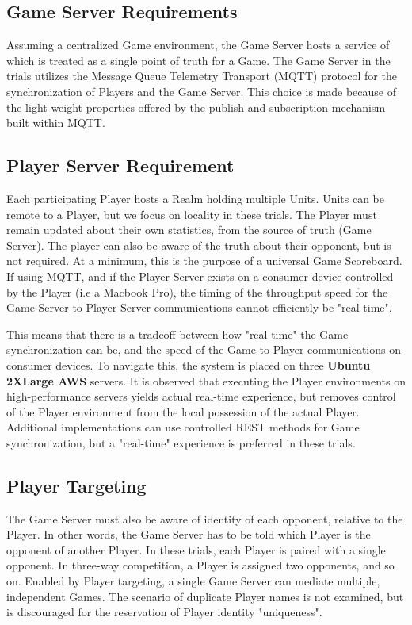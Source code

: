 \documentclass[10pt, titlepage, twocolumn]{article}
\newcommand{\ii}{\indent\indent}
\begin{document}
\subsection{Game Server Requirements}
\ii
Assuming a centralized Game environment, the Game Server hosts a service of which is treated as a single point of truth for a Game. The Game Server in the trials utilizes the Message Queue Telemetry Transport (MQTT) protocol for the synchronization of Players and the Game Server. This choice is made because of the light-weight properties offered by the publish and subscription mechanism built within MQTT.

\subsection{Player Server Requirement}
\ii
Each participating Player hosts a Realm holding multiple Units. Units can be remote to a Player, but we focus on locality in these trials. The Player must remain updated about their own statistics, from the source of truth (Game Server). The player can also be aware of the truth about their opponent, but is not required. At a minimum, this is the purpose of a universal Game Scoreboard. If using MQTT, and if the Player Server exists on a consumer device controlled by the Player (i.e a Macbook Pro), the timing of the throughput speed for the Game-Server to Player-Server communications cannot efficiently be "real-time". 

This means that there is a tradeoff between how "real-time" the Game synchronization can be, and the speed of the Game-to-Player communications on consumer devices. To navigate this, the system is placed on three \textbf{Ubuntu 2XLarge AWS} servers. It is observed that executing the Player environments on high-performance servers yields actual real-time experience, but removes control of the Player environment from the local possession of the actual Player.  Additional implementations can use controlled REST methods for Game synchronization, but a "real-time" experience is preferred in these trials.

\subsection{Player Targeting}
\ii
The Game Server must also be aware of identity of each opponent, relative to the Player. In other words, the Game Server has to be told which Player is the opponent of another Player. In these trials, each Player is paired with a single opponent. In three-way competition, a Player is assigned two opponents, and so on. Enabled by Player targeting, a single Game Server can mediate multiple, independent Games. The scenario of duplicate Player names is not examined, but is discouraged for the reservation of Player identity "uniqueness".
\end{document}
